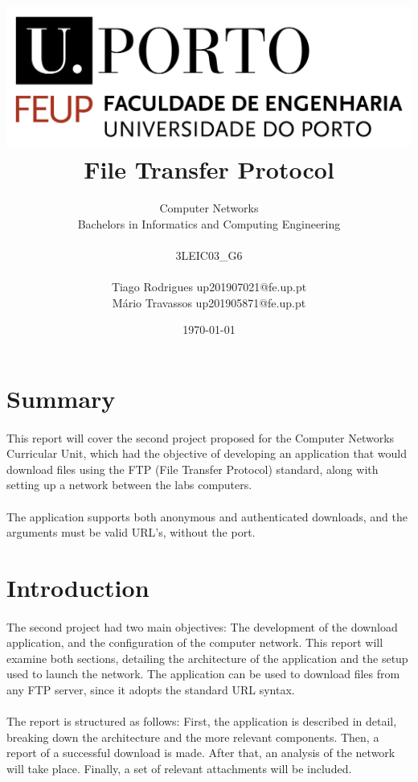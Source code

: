 \documentclass[11pt]{article}
\title{\includegraphics[scale=0.3]{logo.png} \\ \textbf{File Transfer Protocol}}
\author{Computer Networks\\ Bachelors in Informatics and Computing Engineering \\ \\ 3LEIC03\_G6 \\ \\ Tiago
Rodrigues up201907021@fe.up.pt \\ Mário Travassos up201905871@fe.up.pt  }
\date{\today}
\begin{document}
\maketitle

\newpage

\section*{Summary}

\paragraph{}This report will cover the second project proposed for the Computer Networks Curricular Unit, which had the objective of developing an application that would download files using the FTP (File Transfer Protocol) standard, along with setting up a network between the labs computers.

\paragraph{}The application supports both anonymous and authenticated downloads, and the arguments must be valid URL's, without the port.

\section*{Introduction}

\paragraph{}The second project had two main objectives: The development of the download application, and the configuration of the computer network. This report will examine both sections, detailing the architecture of the application and the setup used to launch the network. The application can be used to download files from any FTP server, since it adopts the standard URL syntax.

\paragraph{}The report is structured as follows: First, the application is described in detail, breaking down the architecture and the more relevant components. Then, a report of a successful download is made. After that, an analysis of the network will take place. Finally, a set of relevant attachments will be included.
\end{document}
